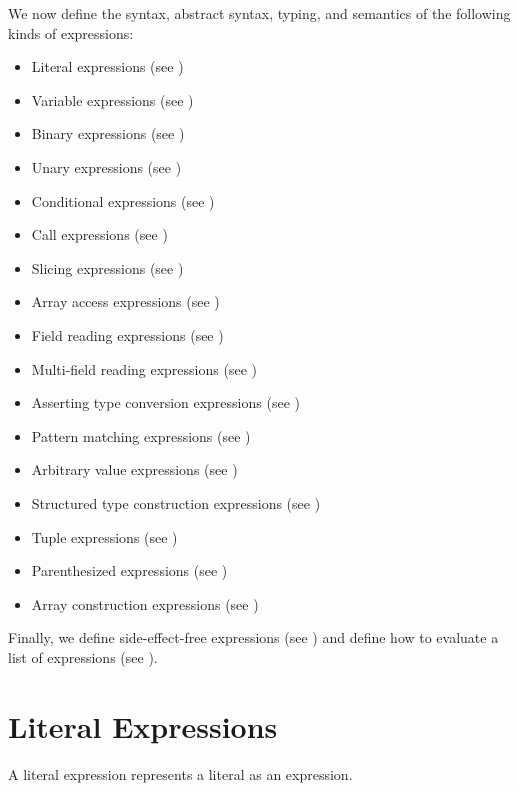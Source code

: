 We now define the syntax, abstract syntax, typing, and semantics of the following kinds of expressions:
\begin{itemize}
  \item Literal expressions (see )
  \item Variable expressions (see )
  \item Binary expressions (see )
  \item Unary expressions (see )
  \item Conditional expressions (see )
  \item Call expressions (see )
  \item Slicing expressions (see )
  \item Array access expressions (see )
  \item Field reading expressions (see )
  \item Multi-field reading expressions (see )
  \item Asserting type conversion expressions (see )
  \item Pattern matching expressions (see )
  \item Arbitrary value expressions (see )
  \item Structured type construction expressions (see )
  \item Tuple expressions (see )
  \item Parenthesized expressions (see )
  \item Array construction expressions (see )
\end{itemize}

Finally, we define side-effect-free expressions (see )
and define how to evaluate a list of expressions (see ).

\section{Literal Expressions\label{sec:LiteralExpressions}}
A literal expression represents a literal as an expression.

